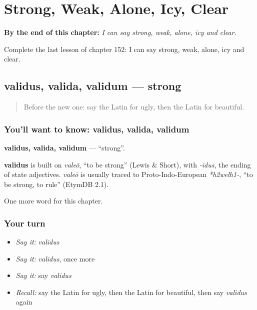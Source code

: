 
\chapter{Strong, Weak, Alone, Icy, Clear}
\label{ch:la-strong-weak-alone-icy-clear}

\begin{chapteropening}
\textbf{By the end of this chapter:} \emph{I can say strong, weak, alone, icy and clear.}

Complete the last lesson of chapter 152: I can say strong, weak, alone, icy and clear.
\end{chapteropening}

\section[validus, valida, validum]{validus, valida, validum — strong}

\label{lesson:LA-C152-validus}



\begin{quote}
Before the new one: say the Latin for ugly, then the Latin for beautiful.
\end{quote}

\subsection*{You'll want to know: validus, valida, validum}
\textbf{validus, valida, validum} — \textquotedblleft{}strong\textquotedblright{}.

\begin{cousinweb}
\textbf{validus} is built on \emph{valeō}, \textquotedblleft{}to be strong\textquotedblright{} (Lewis \& Short), with \emph{-idus}, the ending of state adjectives. \emph{valeō} is usually traced to Proto-Indo-European \emph{*h2welh1-}, \textquotedblleft{}to be strong, to rule\textquotedblright{} (EtymDB 2.1).
\end{cousinweb}

\begin{grammarlens}[title={What you've built}]
One more word for this chapter.
\end{grammarlens}

\subsection*{Your turn}
\begin{itemize}
\raggedright
  \item \emph{Say it:} \emph{validus}
  \item \emph{Say it:} \emph{validus}, once more
  \item \emph{Say it:} say \emph{validus}
  \item \emph{Recall:} say the Latin for ugly, then the Latin for beautiful, then say \emph{validus} again
\end{itemize}

